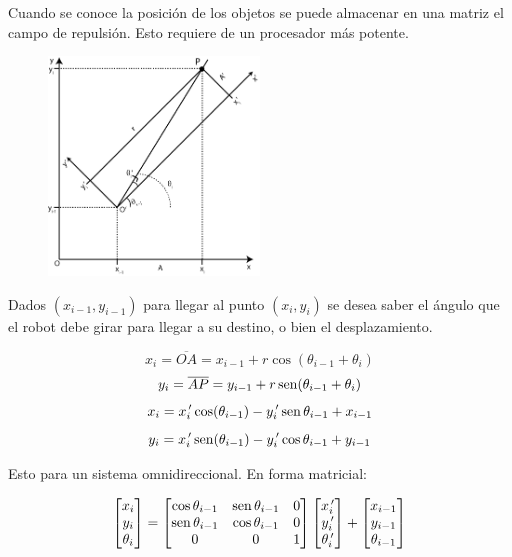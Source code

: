 Cuando se conoce la posición de los objetos se puede almacenar en una matriz el campo de repulsión. Esto requiere de un procesador más potente.

\begin{figure}[h!]
	\centering
	\includegraphics[width=0.5\textwidth]{images/img19.png}
	\label{figura19}
\end{figure}

Dados $(x_{i - 1}, y_{i - 1})$ para llegar al punto $(x_{i}, y_{i})$ se desea saber el ángulo que el robot debe girar para llegar a su destino, o bien el desplazamiento.

$$x_{i} = \overline{OA} = x_{i - 1} + r\cos (\theta_{i - 1} + \theta_{i})$$
$$y_{i} = \overline{AP} = y_{i - 1} + r\mathop{\rm sen}\nolimits (\theta_{i - 1} + \theta_{i})$$
$$x_{i} = x_{i}^{\,\prime} \cos (\theta_{i - 1}) - y_{i}^{\,\prime} \mathop{\rm sen}\nolimits \theta_{i - 1} + x_{i - 1}$$
$$y_{i} = x_{i}^{\,\prime} \mathop{\rm sen}\nolimits (\theta_{i - 1}) - y_{i}^{\,\prime} \cos \theta_{i - 1} + y_{i - 1}$$

Esto para un sistema omnidireccional. En forma matricial:

$$
\begin{bmatrix}
x_{i} \\
y_{i} \\
\theta_{i}
\end{bmatrix} = \begin{bmatrix}
\cos \theta_{i - 1} & \mathop{\rm sen}\nolimits \theta_{i - 1} & 0 \\
\mathop{\rm sen}\nolimits \theta_{i - 1} & \cos \theta_{i - 1} & 0 \\
0                     &                0      & 1
\end{bmatrix} \begin{bmatrix}
x_{i}^{\,\prime} \\
y_{i}^{\,\prime} \\
\theta_{i}^{\,\prime}
\end{bmatrix} + \begin{bmatrix}
x_{i - 1} \\
y_{i - 1} \\
\theta_{i - 1}
\end{bmatrix}
$$

